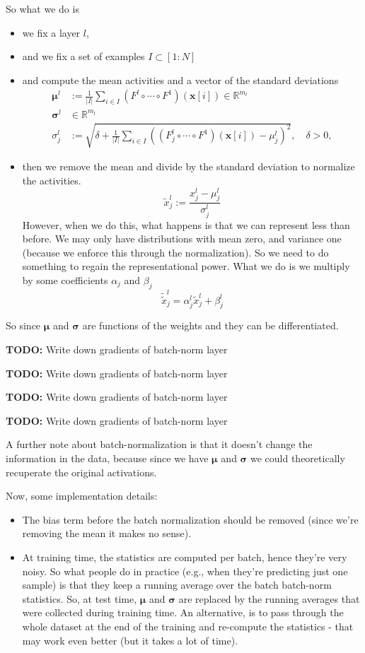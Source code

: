 \documentclass[a2paper,8pt]{extarticle}
\newcommand{\R}{\mathbb{R}}
\newcommand{\card}[1]{\left\lvert #1 \right\rvert}
\renewcommand{\vec}[1]{\mathbf{#1}}
\newcommand{\vx}{\vec{x}}
\newcommand{\vmu}{\boldsymbol{\mu}}
\newcommand{\vsigma}{\boldsymbol{\sigma}}
\newcommand{\todo}[1]{\textbf{TODO:} #1}
\newcommand{\todo}[1]{%
}
\begin{document}
\begin{landscape}
\begin{multicols*}{7}
So what we do is
\begin{itemize}
  \item we fix a layer $l$,
  \item and we fix a set of examples $I\subset[1:N]$
  \item and compute the mean activities and a vector of the standard deviations
\begin{align*}
\vmu^{l}
&:=
\frac{1}{\card{I}}
\sum_{i\in I}
(F^l\circ\cdots\circ F^1)(\vx[i])\in\R^{m_l}
\\
\vsigma^l&\in\R^{m_l}
\\
\sigma_j^l
&:=
\sqrt{
\delta
+
\frac{1}{\card{I}}
\sum_{i\in I}
\left(
(F^l_j\circ\cdots\circ F^1)(\vx[i])
-\mu_j^l
\right)^2
},
\quad
\delta > 0,
\end{align*}
  \item then we remove the mean and divide by the standard deviation to
  normalize the activities.
  \[
  \tilde{x}_j^l
  :=\frac{x_j^l-\mu_j^l}{\sigma_j^l}
  \]
  However, when we do this, what happens is that we can represent less than
  before. We may only have distributions with mean zero, and variance one
  (because we enforce this through the normalization). So we need to do
  something to regain the representational power. What we do is we multiply by
  some coefficients $\alpha_j$ and $\beta_j$
  \[
  \tilde{\tilde{x}}_j^l=\alpha_j^l\tilde{x}_j^l+\beta_j^l
  \]
\end{itemize}
So since $\vmu$ and $\vsigma$ are functions of the weights and they can be
differentiated. 

\todo{Write down gradients of batch-norm layer}

\todo{Write down gradients of batch-norm layer}

\todo{Write down gradients of batch-norm layer}

\todo{Write down gradients of batch-norm layer}

A further note about batch-normalization is that it doesn't change the
information in the data, because since we have $\vmu$ and $\vsigma$ we could
theoretically recuperate the original activations.

Now, some implementation details:
\begin{itemize}
  \item The bias term before the batch normalization should be removed (since
  we're removing the mean it makes no sense).
  \item At training time, the statistics are computed per batch, hence they're
  very noisy. So what people do in practice (e.g., when they're predicting just
  one sample) is that they keep a running average over the batch batch-norm
  statistics. So, at test time, $\vmu$ and $\vsigma$ are replaced by the running
  averages that were collected during training time. An alternative, is to pass
  through the whole dataset at the end of the training and re-compute the
  statistics - that may work even better (but it takes a lot of time).
\end{itemize}


\end{multicols*}
\end{landscape}
\end{document}
